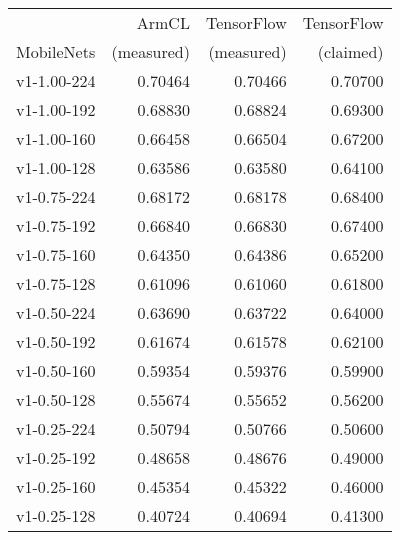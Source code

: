 \begin{tabular}{lrrr}
\toprule
{}          & ArmCL     & TensorFlow& TensorFlow \\
MobileNets  & (measured)& (measured)& (claimed)  \\
\midrule
v1-1.00-224 &  0.70464  &  0.70466  &  0.70700   \\
v1-1.00-192 &  0.68830  &  0.68824  &  0.69300   \\
v1-1.00-160 &  0.66458  &  0.66504  &  0.67200   \\
v1-1.00-128 &  0.63586  &  0.63580  &  0.64100   \\
v1-0.75-224 &  0.68172  &  0.68178  &  0.68400   \\
v1-0.75-192 &  0.66840  &  0.66830  &  0.67400   \\
v1-0.75-160 &  0.64350  &  0.64386  &  0.65200   \\
v1-0.75-128 &  0.61096  &  0.61060  &  0.61800   \\
v1-0.50-224 &  0.63690  &  0.63722  &  0.64000   \\
v1-0.50-192 &  0.61674  &  0.61578  &  0.62100   \\
v1-0.50-160 &  0.59354  &  0.59376  &  0.59900   \\
v1-0.50-128 &  0.55674  &  0.55652  &  0.56200   \\
v1-0.25-224 &  0.50794  &  0.50766  &  0.50600   \\
v1-0.25-192 &  0.48658  &  0.48676  &  0.49000   \\
v1-0.25-160 &  0.45354  &  0.45322  &  0.46000   \\
v1-0.25-128 &  0.40724  &  0.40694  &  0.41300   \\
\bottomrule
\end{tabular}
